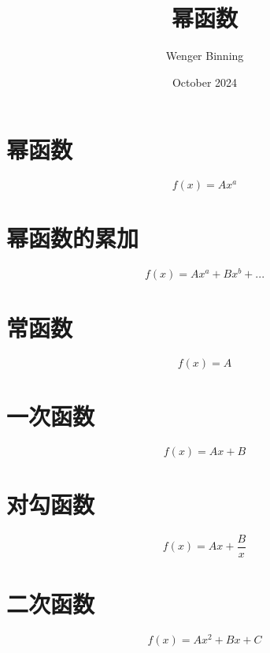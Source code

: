 \documentclass{article}
\title{幂函数}
\author{Wenger Binning }
\date{October 2024}
\begin{document}
\maketitle

\section{幂函数}

$$ f(x) = Ax^a $$

\section{幂函数的累加}

$$ f(x) = Ax^a + Bx^b + ... $$

\section{常函数}

$$ f(x) = A $$

\section{一次函数}

$$ f(x) = Ax + B $$

\section{对勾函数}

$$ f(x) = Ax + \frac{B}{x} $$

\section{二次函数}

$$ f(x) = Ax^2 + Bx + C $$
\end{document}
